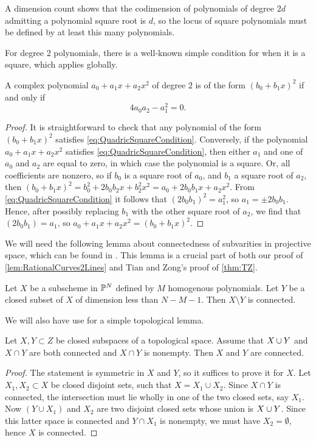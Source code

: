 A dimension count shows that the codimension of polynomials of degree $2d$ admitting a polynomial square root is $d$, so the locus of square polynomials must be defined by at least this many polynomials.

For degree 2 polynomials, there is a well-known simple condition for when it is a square, which applies globally.
\begin{lemma}
\label{lem:QuadricSquarecondition}
	A complex polynomial $a_0 + a_1x + a_2x^2$ of degree $2$ is of the form $(b_0 + b_1x)^2$ if and only if 
	\begin{equation}
		\label{eq:QuadricSquareCondition}
		4a_0a_2 - a_1^2 = 0.
	\end{equation}
\end{lemma}
\begin{proof}
	It is straightforward to check that any polynomial of the form $(b_0 + b_1x)^2$ satisfies \eqref{eq:QuadricSquareCondition}. Conversely, if the polynomial $a_0 + a_1x + a_2x^2$ satisfies \eqref{eq:QuadricSquareCondition}, then either $a_1$ and one of $a_0$ and $a_2$ are equal to zero, in which case the polynomial is a square. Or, all coefficients are nonzero,  so if $b_0$ is a square root of $a_0$, and $b_1$ a square root of $a_2$, then $(b_0 + b_1x)^2 = b_0^2 + 2b_0b_2x + b_2^2x^2 = a_0 + 2b_0b_1x+a_2x^2$. From \eqref{eq:QuadricSquareCondition} it follows that $(2b_0b_1)^2 = a_1^2$, so $a_1 = \pm 2b_0b_1$. Hence, after possibly replacing $b_1$ with the other square root of $a_2$, we find that $(2b_0b_1)=a_1$, so $a_0 + a_1x + a_2x^2 = (b_0 + b_1x)^2$.
\end{proof}

We will need the following lemma about connectedness of subvarities in projective space, which can be found in \cite[Expos\'e XIII, (2.1) and (2.3)]{SGA2}. This lemma is a crucial part of both our proof of \cref{lem:RationalCurves2Lines} and Tian and Zong's proof of \cref{thm:TZ}.
\begin{proposition}
	\label{lem:ProjectiveConnectedness}
	Let $X$ be a subscheme in $\P^N$ defined by $M$ homogenous polynomials. Let $Y$ be a closed subset of $X$ of dimension less than $N-M-1$. Then $X \setminus Y$ is connected.
\end{proposition}

We will also have use for a simple topological lemma.
\begin{lemma}
  \label{lem:Topological}
	Let $X,Y \subset Z$ be closed subspaces of a topological space. Assume that $X \union Y$ and $X \cap Y$ are both connected and $X \cap Y$ is nonempty. Then $X$ and $Y$ are connected.
\end{lemma}
\begin{proof}
	The statement is symmetric in $X$ and $Y$, so it suffices to prove it for $X$. Let $X_1, X_2 \subset X$ be closed disjoint sets, such that $X = X_1 \cup X_2$. Since $X \cap Y$ is connected, the intersection must lie wholly in one of the two closed sets, say $X_1$. Now $(Y \cup X_1)$ and $X_2$ are two disjoint closed sets whose union is $X \union Y$. Since this latter space is connected and $Y \cap X_1$ is nonempty, we must have $X_2 = \emptyset$, hence $X$ is connected.
\end{proof}

